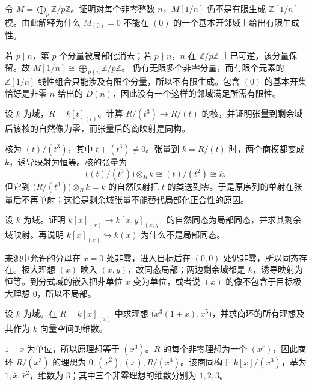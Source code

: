\begin{exercise}\label{b3:ex:02-stalk-versus-neighbourhood}
	令 \(M=\bigoplus_p\mathbb Z/p\mathbb Z\)。证明对每个非零整数 \(n\)，\(M[1/n]\) 仍不是有限生成 \(\mathbb Z[1/n]\) 模。由此解释为什么 \(M_{(0)}=0\) 不能在 \((0)\) 的一个基本开邻域上给出有限生成性。
\end{exercise}
\begin{solution}
	若 \(p\mid n\)，第 \(p\) 个分量被局部化消去；若 \(p\nmid n\)，\(n\) 在 \(\mathbb Z/p\mathbb Z\) 上已可逆，该分量保留。故 \(M[1/n]\cong\bigoplus_{p\nmid n}\mathbb Z/p\mathbb Z\)。 仍有无限多个非零分量，而有限个元素的 \(\mathbb Z[1/n]\) 线性组合只能涉及有限个分量，所以不有限生成。包含 \((0)\) 的基本开集恰好是非零 \(n\) 给出的 \(D(n)\)，因此没有一个这样的邻域满足所需有限性。
\end{solution}

\begin{exercise}\label{b3:ex:02-fibre-misses-kernel}
	设 \(k\) 为域，\(R=k[t]_{(t)}\)。计算 \(R/(t^3)\rightarrow R/(t)\) 的核，并证明张量到剩余域后该核的自然像为零，而张量后的商映射是同构。
\end{exercise}
\begin{solution}
	核为 \((t)/(t^3)\)，其中 \(t+(t^3)\ne0\)。张量到 \(k=R/(t)\) 时，两个商模都变成 \(k\)，诱导映射为恒等。核的张量为
	\[
		\bigl((t)/(t^3)\bigr)\otimes_R k \cong(t)/(t^2)\cong k,
	\]
	但它到 \(\bigl(R/(t^3)\bigr)\otimes_R k=k\) 的自然映射把 \(t\) 的类送到零。于是原序列的单射在张量后不再单射；这恰是剩余域张量不能替代局部化正合性的原因。
\end{solution}

\begin{exercise}\label{b3:ex:02-local-map-examples}
	设 \(k\) 为域。证明 \(k[x]_{(x)}\rightarrow k[x,y]_{(x,y)}\) 的自然同态为局部同态，并求其剩余域映射。再说明 \(k[x]_{(x)}\hookrightarrow k(x)\) 为什么不是局部同态。
\end{exercise}
\begin{solution}
	来源中允许的分母在 \(x=0\) 处非零，进入目标后在 \((0,0)\) 处仍非零，所以同态存在。极大理想 \((x)\) 映入 \((x,y)\)，故同态局部；两边剩余域都是 \(k\)，诱导映射为恒等。到分式域的嵌入把非单位 \(x\) 变为单位，或者说 \((x)\) 的像不包含于目标极大理想 \(0\)，所以不局部。
\end{solution}

\begin{exercise}\label{b3:ex:02-dvr-ideals}
	设 \(k\) 为域。在 \(R=k[x]_{(x)}\) 中求理想 \(\bigl(x^3(1+x),x^5\bigr)\)，并求商环的所有理想及其作为 \(k\) 向量空间的维数。
\end{exercise}
\begin{solution}
	\(1+x\) 为单位，所以原理想等于 \((x^3)\)。\(R\) 的每个非零理想为一个 \((x^r)\)，因此商环 \(R/(x^3)\) 的理想为 \(0,(\bar x^2),(\bar x),R/(x^3)\)。该商同构于 \(k[x]/(x^3)\)，基为 \(1,\bar x,\bar x^2\)，维数为 \(3\)；其中三个非零理想的维数分别为 \(1,2,3\)。
\end{solution}


